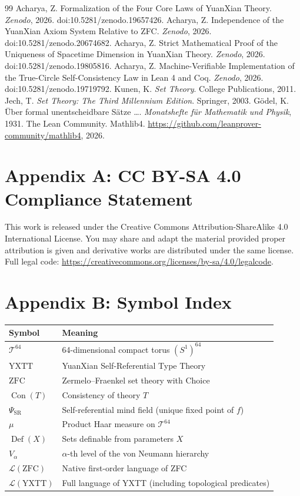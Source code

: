 \documentclass[12pt,a4paper]{article}
\theoremstyle{plain}
\theoremstyle{definition}
\newcommand{\Tsixtyfour}{\mathcal{T}^{64}}
\newcommand{\PSR}{\Psi_{\mathrm{SR}}}
\newcommand{\YXTT}{\mathrm{YXTT}}
\newcommand{\ZFC}{\mathrm{ZFC}}
\newcommand{\Con}{\operatorname{Con}}
\DeclareMathOperator{\Def}{Def}
\begin{document}
\begin{thebibliography}{99}
 Acharya, Z. Formalization of the Four Core Laws of YuanXian Theory. \textit{Zenodo}, 2026. doi:10.5281/zenodo.19657426.
 Acharya, Z. Independence of the YuanXian Axiom System Relative to ZFC. \textit{Zenodo}, 2026. doi:10.5281/zenodo.20674682.
 Acharya, Z. Strict Mathematical Proof of the Uniqueness of Spacetime Dimension in YuanXian Theory. \textit{Zenodo}, 2026. doi:10.5281/zenodo.19805816.
 Acharya, Z. Machine-Verifiable Implementation of the True-Circle Self-Consistency Law in Lean 4 and Coq. \textit{Zenodo}, 2026. doi:10.5281/zenodo.19719792.
 Kunen, K. \textit{Set Theory}. College Publications, 2011.
 Jech, T. \textit{Set Theory: The Third Millennium Edition}. Springer, 2003.
 Gödel, K. Über formal unentscheidbare Sätze \ldots. \textit{Monatshefte für Mathematik und Physik}, 1931.
 The Lean Community. Mathlib4. \url{https://github.com/leanprover-community/mathlib4}, 2026.
\end{thebibliography}

\appendix
\section*{Appendix A: CC BY-SA 4.0 Compliance Statement}
This work is released under the Creative Commons Attribution-ShareAlike 4.0 International License. You may share and adapt the material provided proper attribution is given and derivative works are distributed under the same license. Full legal code: \url{https://creativecommons.org/licenses/by-sa/4.0/legalcode}.

\section*{Appendix B: Symbol Index}
\begin{longtable}{p{2.5cm}p{10cm}}
\toprule
\textbf{Symbol} & \textbf{Meaning} \\
\midrule
$\Tsixtyfour$ & 64-dimensional compact torus $(S^1)^{64}$ \\
$\YXTT$ & YuanXian Self-Referential Type Theory \\
$\ZFC$ & Zermelo--Fraenkel set theory with Choice \\
$\Con(T)$ & Consistency of theory $T$ \\
$\PSR$ & Self-referential mind field (unique fixed point of $f$) \\
$\mu$ & Product Haar measure on $\Tsixtyfour$ \\
$\Def(X)$ & Sets definable from parameters $X$ \\
$V_\alpha$ & $\alpha$-th level of the von Neumann hierarchy \\
$\mathcal{L}(\ZFC)$ & Native first-order language of ZFC \\
$\mathcal{L}(\YXTT)$ & Full language of YXTT (including topological predicates) \\
\bottomrule
\end{longtable}
\end{document}
